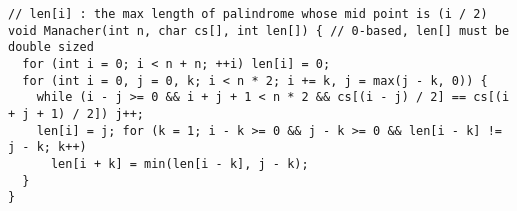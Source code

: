 \begin{lstlisting}
// len[i] : the max length of palindrome whose mid point is (i / 2)
void Manacher(int n, char cs[], int len[]) { // 0-based, len[] must be double sized
  for (int i = 0; i < n + n; ++i) len[i] = 0;
  for (int i = 0, j = 0, k; i < n * 2; i += k, j = max(j - k, 0)) {
    while (i - j >= 0 && i + j + 1 < n * 2 && cs[(i - j) / 2] == cs[(i + j + 1) / 2]) j++;
    len[i] = j; for (k = 1; i - k >= 0 && j - k >= 0 && len[i - k] != j - k; k++)
      len[i + k] = min(len[i - k], j - k);
  }
}
\end{lstlisting}